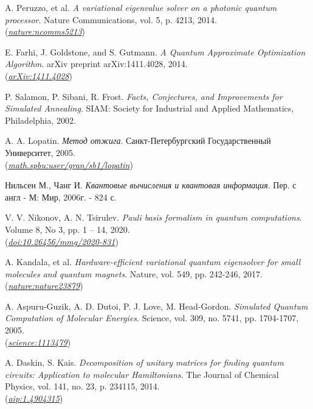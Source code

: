\documentclass[a4paper]{report}
\begin{document}
\begin{thebibliography}{99}
    A. Peruzzo, et al. \textit{A variational eigenvalue solver on a photonic quantum processor}. Nature Communications, vol. 5, p. 4213, 2014.\\
    (\href{https://www.nature.com/articles/ncomms5213}{\textit{nature:ncomms5213}})

    E. Farhi, J. Goldstone, and S. Gutmann. \textit{A Quantum Approximate Optimization Algorithm}. arXiv preprint arXiv:1411.4028, 2014.\\
    (\href{https://arxiv.org/abs/1411.4028}{\textit{arXiv:1411.4028}})

    P. Salamon, P. Sibani, R. Frost. \textit{Facts, Conjectures, and Improvements for Simulated Annealing}. SIAM: Society for Industrial and Applied Mathematics, Philadelphia, 2002.

    A. A. Lopatin. \textit{Метод отжига}. Санкт-Петербургский Государственный Университет, 2005.\\
    (\href{https://math.spbu.ru/user/gran/sb1/lopatin.pdf}{\textit{math.spbu:user/gran/sb1/lopatin}})

    Нильсен М., Чанг И. \textit{Квантовые вычисления и квантовая информация}. Пер. с англ - М: Мир, 2006г. - 824 с.

    V. V. Nikonov, A. N. Tsirulev. \textit{Pauli basis formalism in quantum computations}. Volume 8, No 3, pp. 1 – 14, 2020.\\
    (\href{https:doi.org/10.26456/mmg/2020-831} {\textit{doi:10.26456/mmg/2020-831}})

    A. Kandala, et al. \textit{Hardware-efficient variational quantum eigensolver for small molecules and quantum magnets}. Nature, vol. 549, pp. 242-246, 2017.\;    (\href{https://www.nature.com/articles/nature23879}{\textit{nature:nature23879}})

    A. Aspuru-Guzik, A. D. Dutoi, P. J. Love, M. Head-Gordon. \textit{Simulated Quantum Computation of Molecular Energies}. Science, vol. 309, no. 5741, pp. 1704-1707, 2005.\\
    (\href{https://www.science.org/doi/10.1126/science.1113479}{\textit{science:1113479}})

    A. Daskin, S. Kais. \textit{Decomposition of unitary matrices for finding quantum circuits: Application to molecular Hamiltonians}. The Journal of Chemical Physics, vol. 141, no. 23, p. 234115, 2014.\\
    (\href{https://aip.scitation.org/doi/10.1063/1.4904315}{\textit{aip:1.4904315}})


\end{thebibliography}
\end{document}
